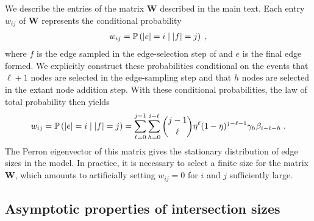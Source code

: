 We describe the entries of the matrix $\mathbf{W}$ described in the main text. 
Each entry $w_{ij}$ of $\mathbf{W}$ represents the conditional probability 
\begin{align}
    w_{ij} = \prob{\abs{e} = i \given \abs{f} = j}\;,
\end{align}
where $f$ is the edge sampled in the edge-selection step of  and $e$ is the final edge formed.  
We explicitly construct these probabilities conditional on the events that $\ell+1$ nodes are selected in the edge-sampling step and that $h$ nodes are selected in the extant node addition step. 
With these conditional probabilities, the law of total probability then yields 
\begin{align}
    w_{ij} = \prob{\abs{e} = i \given \abs{f} = j} 
           = \sum_{\ell = 0}^{j-1} \sum_{h = 0}^{i - \ell} \binom{j-1}{\ell} \eta^{\ell} (1-\eta)^{j - \ell - 1} \extantnodepar_h \novelnodepar_{i - \ell - h}\;.
\end{align}
The Perron eigenvector of this matrix gives the stationary distribution of edge sizes in the model. 
In practice, it is necessary to select a finite size for the matrix $\mathbf{W}$, which amounts to artificially setting $w_{ij} = 0$ for $i$ and $j$ sufficiently large. 




\subsection{Asymptotic properties of intersection sizes} \label{sec:intersection-sizes}

